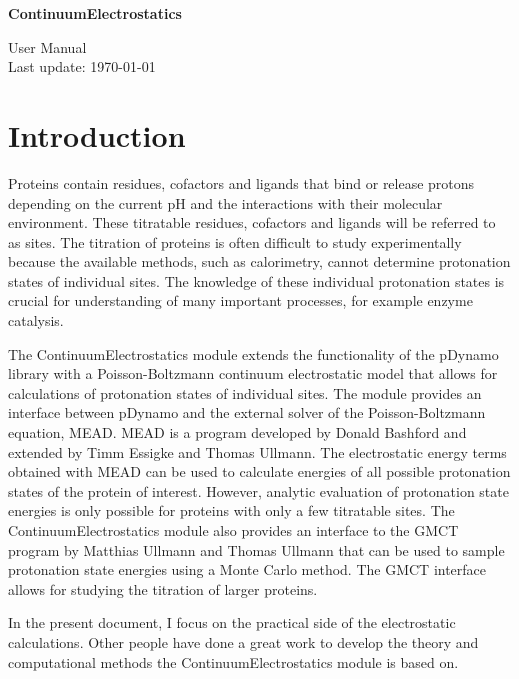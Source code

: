 \documentclass[a4paper,11pt]{article}
\newcommand{\modulename}{ContinuumElectrostatics\xspace}
\begin{document}
\begin{center}
{\LARGE \bf \modulename}

\vspace{0.5cm}
{\Large User Manual\\
Last update: \today}

\end{center}

\vspace{2cm}


\section{Introduction}
Proteins contain residues, cofactors and ligands that bind or release protons
depending on the current pH and the interactions with their molecular
environment.
%
These titratable residues, cofactors and ligands will be referred to as sites.
%
The titration of proteins is often difficult to study experimentally because
the available methods, such as calorimetry, cannot determine protonation states
of individual sites.
%
The knowledge of these individual protonation states is crucial for
understanding of many important processes, for example enzyme catalysis.


The \modulename module extends the functionality of the pDynamo
library with a Poisson-Boltzmann continuum electrostatic model that allows for
calculations of protonation states of individual sites.
%
The module provides an interface between pDynamo and the external solver of
the Poisson-Boltzmann equation, MEAD.
%
MEAD is a program developed by Donald Bashford and extended by Timm Essigke
and Thomas Ullmann.
%
The electrostatic energy terms obtained with MEAD can be used to calculate
energies of all possible protonation states of the protein of interest.
%
However, analytic evaluation of protonation state energies is only possible
for proteins with only a few titratable sites.
%
The \modulename module also provides an interface to the GMCT
program by Matthias Ullmann and Thomas Ullmann that can be used to sample
protonation state energies using a Monte Carlo method.
%
The GMCT interface allows for studying the titration of larger proteins.


In the present document, I focus on the practical side of the
electrostatic calculations.
%
Other people have done a great work to develop the theory and computational
methods the \modulename module is based on.
%
\end{document}
